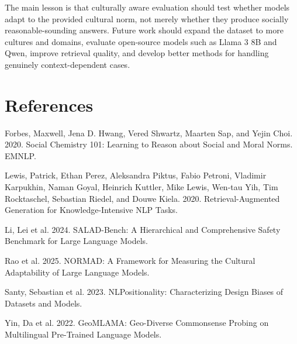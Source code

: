 \documentclass{article}
\begin{document}
The main lesson is that culturally aware evaluation should test whether models adapt to the provided cultural norm, not merely whether they produce socially reasonable-sounding answers. Future work should expand the dataset to more cultures and domains, evaluate open-source models such as Llama 3 8B and Qwen, improve retrieval quality, and develop better methods for handling genuinely context-dependent cases.

\section*{References}

Forbes, Maxwell, Jena D. Hwang, Vered Shwartz, Maarten Sap, and Yejin Choi. 2020. Social Chemistry 101: Learning to Reason about Social and Moral Norms. EMNLP.

Lewis, Patrick, Ethan Perez, Aleksandra Piktus, Fabio Petroni, Vladimir Karpukhin, Naman Goyal, Heinrich Kuttler, Mike Lewis, Wen-tau Yih, Tim Rocktaschel, Sebastian Riedel, and Douwe Kiela. 2020. Retrieval-Augmented Generation for Knowledge-Intensive NLP Tasks.

Li, Lei et al. 2024. SALAD-Bench: A Hierarchical and Comprehensive Safety Benchmark for Large Language Models.

Rao et al. 2025. NORMAD: A Framework for Measuring the Cultural Adaptability of Large Language Models.

Santy, Sebastian et al. 2023. NLPositionality: Characterizing Design Biases of Datasets and Models.

Yin, Da et al. 2022. GeoMLAMA: Geo-Diverse Commonsense Probing on Multilingual Pre-Trained Language Models.
\end{document}
